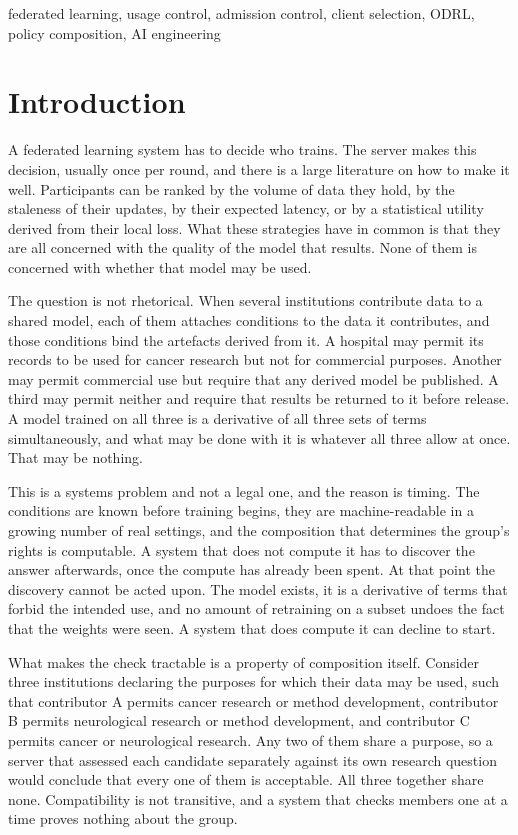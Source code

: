 \documentclass[10pt,conference]{IEEEtran}
\begin{document}
\begin{IEEEkeywords}
federated learning, usage control, admission control, client selection, ODRL,
policy composition, AI engineering
\end{IEEEkeywords}

\section{Introduction}
\label{sec:intro}

A federated learning system has to decide who trains. The server makes this decision, usually once per round, and there is a large literature on how to make it well. Participants can be ranked by the volume of data they hold, by the staleness of their updates, by their expected latency, or by a statistical utility derived from their local loss. What these strategies have in common is
that they are all concerned with the quality of the model that results. None of
them is concerned with whether that model may be used.

The question is not rhetorical. When several institutions contribute data to a
shared model, each of them attaches conditions to the data it contributes, and
those conditions bind the artefacts derived from it. A hospital may permit its
records to be used for cancer research but not for commercial purposes. Another may permit commercial use but require that any derived model be published. A third may permit neither and require that results be returned to it before
release. A model trained on all three is a derivative of all three sets of
terms simultaneously, and what may be done with it is whatever all three allow
at once. That may be nothing.

This is a systems problem and not a legal one, and the reason is timing. The
conditions are known before training begins, they are machine-readable in a
growing number of real settings, and the composition that determines the
group's rights is computable. A system that does not compute it has to discover the answer afterwards, once the compute has already been spent. At that point the discovery cannot be acted upon. The model exists, it is a derivative of terms that forbid the intended use, and no amount of retraining on a subset undoes the fact that the weights were seen. A system that does compute it can decline to
start.

What makes the check tractable is a property of composition itself. Consider
three institutions declaring the purposes for which their data may be used, such
that contributor A permits cancer research or method development, contributor B
permits neurological research or method development, and contributor C permits
cancer or neurological research. Any two of them share a purpose, so a server
that assessed each candidate separately against its own research question would
conclude that every one of them is acceptable. All three together share none.
Compatibility is not transitive, and a system that checks members one at a time
proves nothing about the group.
\end{document}
